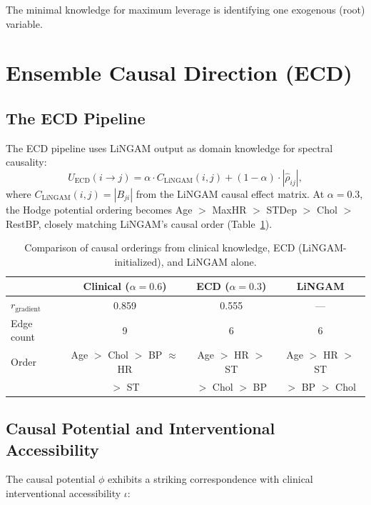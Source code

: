 \documentclass[twoside,11pt]{article}
\newcommand{\ECD}{\mathrm{ECD}}
\begin{document}
The minimal knowledge for maximum leverage is identifying one exogenous
(root) variable.

\section{Ensemble Causal Direction (ECD)}
\label{sec:ecd}

\subsection{The ECD Pipeline}

The ECD pipeline uses LiNGAM output as domain knowledge for spectral
causality:
\begin{equation}
\label{eq:ecd}
  U_{\ECD}(i\to j)
  = \alpha\cdot C_{\mathrm{LiNGAM}}(i,j)
  + (1-\alpha)\cdot|\hat\rho_{ij}|,
\end{equation}
where $C_{\mathrm{LiNGAM}}(i,j)=|B_{ji}|$ from the LiNGAM causal
effect matrix.  At $\alpha=0.3$, the Hodge potential ordering becomes
Age $>$ MaxHR $>$ STDep $>$ Chol $>$ RestBP, closely matching
LiNGAM's causal order (Table~\ref{tab:ecd}).

\begin{table}[t]
\centering
\caption{Comparison of causal orderings from clinical knowledge, ECD
  (LiNGAM-initialized), and LiNGAM alone.}
\label{tab:ecd}
\begin{tabular}{lccc}
\toprule
& Clinical ($\alpha=0.6$) & ECD ($\alpha=0.3$) & LiNGAM \\
\midrule
$r_{\mathrm{gradient}}$ & 0.859 & 0.555 & --- \\
Edge count & 9 & 6 & 6 \\
Order & Age $>$ Chol $>$ BP $\approx$ HR & Age $>$ HR $>$ ST &
  Age $>$ HR $>$ ST \\
& $>$ ST & $>$ Chol $>$ BP & $>$ BP $>$ Chol \\
\bottomrule
\end{tabular}
\end{table}

\subsection{Causal Potential and Interventional Accessibility}

The causal potential $\phi$ exhibits a striking correspondence with
clinical interventional accessibility $\iota$:
\end{document}

